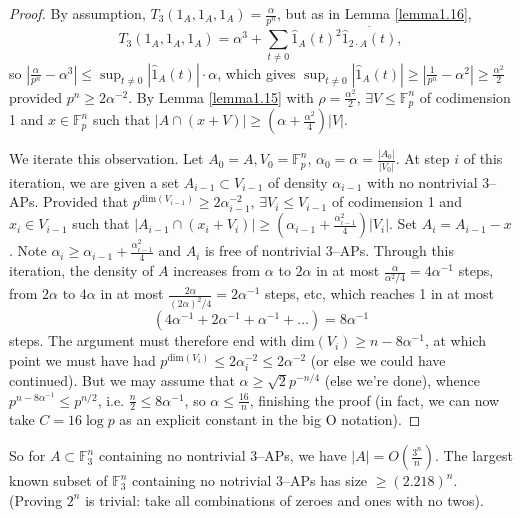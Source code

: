 \documentclass{article}
\theoremstyle{definition}
\begin{document}
\begin{proof}
    By assumption, $T_3(1_A,1_A,1_A) = \frac{\alpha}{p^n}$, but as in Lemma \ref{lemma1.16}, \[
    T_3(1_A,1_A,1_A) = \alpha^3 + \sum_{t\neq 0}^{} \hat{1}_A(t)^2 \overline{\hat{1}_{2\cdot A}(t)},
    \]
    so $\left|\frac{\alpha}{p^n}-\alpha^3 \right| \le  \sup_{t\neq 0} |\hat{1}_A(t)| \cdot \alpha$, which gives $\sup_{t\neq 0}|\hat{1}_A(t)| \ge \left|\frac{1}{p^n}-\alpha^2\right| \ge \frac{\alpha^2}{2}$ provided $p^n \ge 2\alpha^{-2}$.
    By Lemma \ref{lemma1.15} with $\rho = \frac{\alpha^2}{2}$, $\exists V \le \mathbb{F}_p^n$ of codimension 1 and $x \in \mathbb{F}_p^n$ such that $|A \cap (x+V)| \ge \left(\alpha +\frac{\alpha^2}{4}\right)|V|$.
    \vspace{1mm}
     
    We iterate this observation. Let $A_0 = A, V_0 = \mathbb{F}_p^n$, $\alpha_0 = \alpha = \frac{|A_0|}{|V_0|}$. At step $i$ of this iteration, we are given a set $A_{i-1} \subset V_{i-1}$ of density $\alpha_{i-1}$ with no nontrivial 3--APs. Provided that $p^{\text{dim}(V_{i-1})}\ge 2\alpha_{i-1}^{-2}$, $\exists V_i \le V_{i-1}$ of codimension 1 and $x_i \in V_{i-1}$ such that $|A_{i-1} \cap (x_i + V_i)|\ge \left(\alpha_{i-1} + \frac{\alpha_{i-1}^2}{4}\right)|V_{i}|$. Set $A_i = A_{i-1} - x$. Note $\alpha_i \ge \alpha_{i-1}+\frac{\alpha_{i-1}^2}{4}$ and $A_i$ is free of nontrivial 3--APs. Through this iteration, the density of $A$ increases from $\alpha$ to $2\alpha$ in at most $\frac{\alpha}{\alpha^2/4} = 4\alpha^{-1}$ steps, from $2\alpha$ to $4\alpha$ in at most $\frac{2\alpha}{(2\alpha)^2/4} = 2\alpha^{-1}$ steps, etc, which reaches 1 in at most 
    \[
        (4\alpha^{-1} + 2\alpha^{-1} + \alpha^{-1} + \ldots) = 8\alpha^{-1}
    \]
    steps. The argument must therefore end with $\text{dim}(V_i)\ge n - 8\alpha^{-1}$, at which point we must have had $p^{\text{dim}(V_i)}\le 2\alpha_i^{-2}\le 2\alpha^{-2}$ (or else we could have continued). But we may assume that $\alpha \ge \sqrt{2}p^{-n/4}$ (else we're done), whence $p^{n - 8 \alpha ^{-1}} \le p^{n/2}$, i.e. $\frac{n}{2} \le 8\alpha ^{-1}$, so $\alpha \le \frac{16}{n}$, finishing the proof (in fact, we can now take $C = 16\log p$ as an explicit constant in the big O notation). 
\end{proof}


So for $A \subset \mathbb{F}_3^n$ containing no nontrivial 3--APs, we have $|A| = O\left(\frac{3^n}{n}\right)$. The largest known subset of $\mathbb{F}_3^n$ containing no notrivial 3--APs has size $\ge (2.218)^n$. (Proving $2^n$ is trivial: take all combinations of zeroes and ones with no twos).
\end{document}
